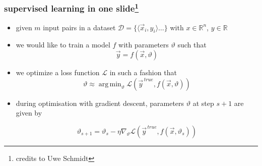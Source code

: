 \documentclass[
  aspectratio=1610, %
  intlimits %
]{beamer}
\DeclareMathOperator*{\argmin}{arg\,min}
\begin{document}
\begin{frame}
  \frametitle{supervised learning in one slide\footnote{credits to Uwe Schmidt}}
  \vfill
  \begin{exampleblock}{}
   \begin{itemize}
   \item given $m$ input pairs in a dataset $\mathcal{D} = \{\langle \vec{x}_i, y_i\rangle \dots \}$ with $x \in \mathbb{R}^n$, $y \in \mathbb{R}$
   \item we would like to train a model $f$ with parameters $\vartheta$ such that 
     \begin{equation*}
     \vec{y} = f(\vec{x}, \vartheta)
   \end{equation*}
   \item we optimize a loss function $\mathcal{L}$ in such a fashion that 
     \begin{equation*}
     \vartheta \approx \argmin_{\vartheta} \mathcal{L}( \vec{y}^{\,true}, f(\vec{x}, \vartheta) )
   \end{equation*}
   \item during optimisation with gradient descent, parameters $\vartheta$ at step $s+1$ are given by

     \begin{equation*}
\vartheta_{s+1} = \vartheta_{s} - \eta \nabla_{\vartheta}\mathcal{L}( \vec{y}^{\,true}, f(\vec{x}, \vartheta_{s}))
\end{equation*}

   \end{itemize}
 \end{exampleblock}
  \vfill
  
\end{frame}
\end{document}
